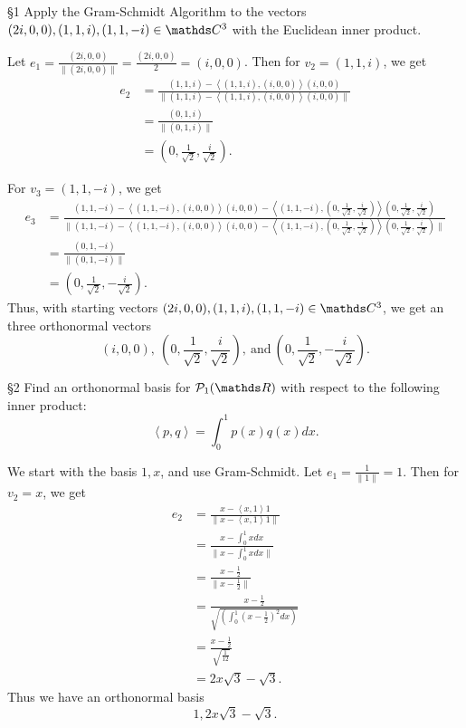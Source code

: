 \documentclass{review-sheet}
\begin{document}
\begin{problem}{\S 1}
  Apply the Gram-Schmidt Algorithm to the vectors $(2i,0,0),(1,1,i),(1,1,-i)\in \C^3$ with the
  Euclidean inner product.
\end{problem}
\begin{solution}
  Let $e_1=\frac{(2i,0,0)}{\|(2i,0,0)\|}=\frac{(2i,0,0)}{2}=(i,0,0)$. Then for $v_2=(1,1,i)$, we get
  \begin{align*}
    e_2&=\frac{(1,1,i)-\left<(1,1,i),(i,0,0) \right>(i,0,0)}{\|(1,1,i)-\left<(1,1,i),(i,0,0)
    \right>(i,0,0)\|}\\
       &=\frac{(0,1,i)}{\|(0,1,i)\|}\\
       &=\left( 0,\frac{1}{\sqrt{2}},\frac{i}{\sqrt{2}} \right) 
  .\end{align*}

  For $v_3=(1,1,-i)$, we get
  \begin{align*}
    e_3&= \frac{(1,1,-i)-\left<(1,1,-i),(i,0,0) \right>(i,0,0)-\left<(1,1,-i),\left(
    0,\frac{1}{\sqrt{2}},\frac{i}{\sqrt{2}} \right)
  \right>\left(0,\frac{1}{\sqrt{2}},\frac{i}{\sqrt{2}}\right)}{\|(1,1,-i)-\left<(1,1,-i),(i,0,0)
\right>(i,0,0)-\left<(1,1,-i),\left( 0,\frac{1}{\sqrt{2}},\frac{i}{\sqrt{2}} \right)
\right>\left(0,\frac{1}{\sqrt{2}},\frac{i}{\sqrt{2}}\right)\|} \\
       &= \frac{(0,1,-i)}{\|(0,1,-i)\|} \\
       &= \left( 0,\frac{1}{\sqrt{2}},-\frac{i}{\sqrt{2}} \right) 
  .\end{align*}
  Thus, with starting vectors $(2i,0,0),(1,1,i),(1,1,-i)\in \C^3$, we get an three orthonormal
  vectors \[
    (i,0,0),\
    \left(0,\frac{1}{\sqrt{2}},\frac{i}{\sqrt{2}}\right),~\text{and}~\left(0,\frac{1}{\sqrt{2}},-\frac{i}{\sqrt{2}}\right)
  .\] 
\end{solution}

\begin{problem}{\S 2}
  Find an orthonormal basis for $\mc{P}_1(\R)$ with respect to the following inner product: \[
    \left<p,q \right>=\int_0^1p(x)q(x)dx
  .\] 
\end{problem}
\begin{solution}
  We start with the basis $1,x$, and use Gram-Schmidt. Let $e_1=\frac{1}{\|1\|}=1$. Then for
  $v_2=x$, we get
  \begin{align*}
    e_2&= \frac{x-\left<x,1 \right>1}{\|x-\left<x,1 \right>1\|} \\
       &= \frac{x-\int_0^1xdx}{\|x-\int_0^1xdx\|}\\
       &= \frac{x-\frac{1}{2}}{\|x-\frac{1}{2}\|}\\
       &= \frac{x-\frac{1}{2}}{\sqrt{\left( \int_0^1(x-\frac{1}{2})^2dx \right)}}\\
       &=\frac{x-\frac{1}{2}}{\sqrt{\frac{1}{12}}}\\
       &= 2x\sqrt{3}-\sqrt{3}
  .\end{align*}
  Thus we have an orthonormal basis \[
    1, 2x\sqrt{3}-\sqrt{3}
  .\] 
\end{solution}
\end{document}

